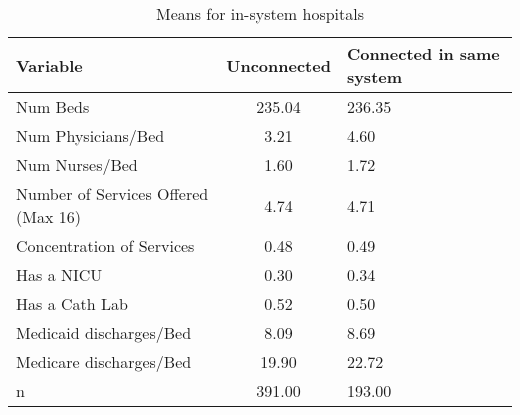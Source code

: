 \begin{table}[ht!]
\centering
\caption{Means for in-system hospitals}
\centering
\begin{tabular}[t]{lcl}
\toprule
Variable & Unconnected & Connected in same system\\
\midrule
Num Beds & 235.04 & 236.35\\
Num Physicians/Bed & 3.21 & 4.60\\
Num Nurses/Bed & 1.60 & 1.72\\
Number of Services Offered (Max 16) & 4.74 & 4.71\\
Concentration of Services & 0.48 & 0.49\\
\addlinespace
Has a NICU & 0.30 & 0.34\\
Has a Cath Lab & 0.52 & 0.50\\
Medicaid discharges/Bed & 8.09 & 8.69\\
Medicare discharges/Bed & 19.90 & 22.72\\
n & 391.00 & 193.00\\
\bottomrule
\end{tabular}
\end{table}
